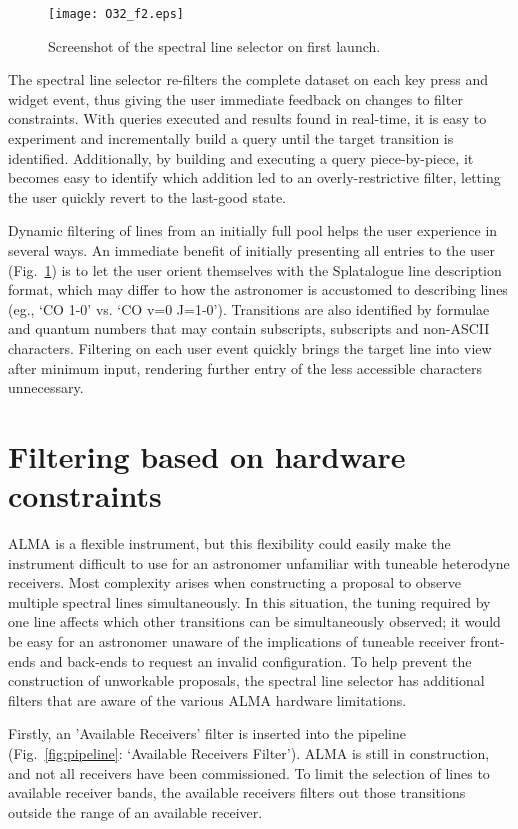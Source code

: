 \documentclass[11pt,twoside]{article}
\begin{document}
\begin{figure}
	\texttt{[image: O32\_f2.eps]}
	\caption{Screenshot of the spectral line selector on first launch.}
	\label{fig:screenshot}
\end{figure}

The spectral line selector re-filters the complete dataset on each key press and widget event, thus giving the user immediate feedback on changes to filter constraints. With queries executed and results found in real-time, it is easy to experiment and incrementally build a query until the target transition is identified. Additionally, by building and executing a query piece-by-piece, it becomes easy to identify which addition led to an overly-restrictive filter, letting the user quickly revert to the last-good state.

Dynamic filtering of lines from an initially full pool helps the user experience in several ways. An immediate benefit of initially presenting all entries to the user (Fig.~\ref{fig:screenshot}) is to let the user orient themselves with the Splatalogue line description format, which may differ to how the astronomer is accustomed to describing lines (eg., `CO 1-0' vs. `CO v=0 J=1-0'). Transitions are also identified by formulae and quantum numbers that may contain subscripts, subscripts and non-ASCII characters. Filtering on each user event quickly brings the target line into view after minimum input, rendering further entry of the less accessible characters unnecessary.

\section{Filtering based on hardware constraints}
\label{sec:hardware filters}
ALMA is a flexible instrument, but this flexibility could easily make the instrument difficult to use for an astronomer unfamiliar with tuneable heterodyne receivers. Most complexity arises when constructing a proposal to observe multiple spectral lines simultaneously. In this situation, the tuning required by one line affects which other transitions can be simultaneously observed; it would be easy for an astronomer unaware of the implications of tuneable receiver front-ends and back-ends to request an invalid configuration. To help prevent the construction of unworkable proposals, the spectral line selector has additional filters that are aware of the various ALMA hardware limitations. 

Firstly, an 'Available Receivers' filter is inserted into the pipeline  (Fig.~\ref{fig:pipeline}: `Available Receivers Filter'). ALMA is still in construction, and not all receivers have been commissioned. To limit the selection of lines to available receiver bands, the available receivers filters out those transitions outside the range of an available receiver. 
\end{document}
